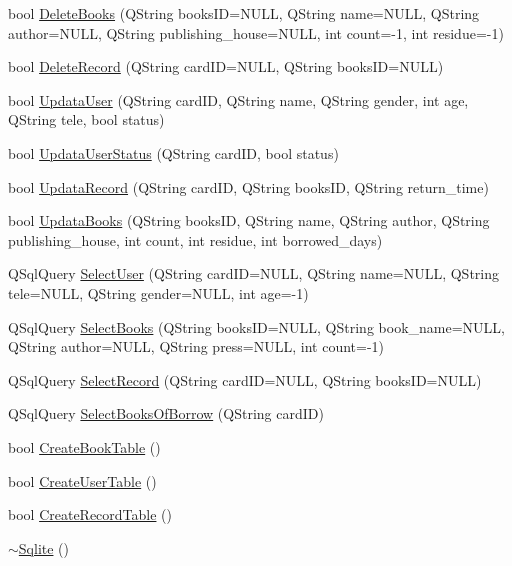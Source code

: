 \begin{DoxyCompactItemize}
\item 
bool \mbox{\hyperlink{class_sqlite_a8a83c22e036086edf84758fb0f6cfc56}{Delete\+Books}} (Q\+String books\+ID=N\+U\+LL, Q\+String name=N\+U\+LL, Q\+String author=N\+U\+LL, Q\+String publishing\+\_\+house=N\+U\+LL, int count=-\/1, int residue=-\/1)
\item 
bool \mbox{\hyperlink{class_sqlite_aa120de86db20f42a61a5c2eae9ad6b89}{Delete\+Record}} (Q\+String card\+ID=N\+U\+LL, Q\+String books\+ID=N\+U\+LL)
\item 
bool \mbox{\hyperlink{class_sqlite_a7909130f3bbef819bd808c49c9249e2c}{Updata\+User}} (Q\+String card\+ID, Q\+String name, Q\+String gender, int age, Q\+String tele, bool status)
\item 
bool \mbox{\hyperlink{class_sqlite_a9827a7be15c19a7ecc943b701baa932b}{Updata\+User\+Status}} (Q\+String card\+ID, bool status)
\item 
bool \mbox{\hyperlink{class_sqlite_a5cb753f7b603cc450ef9527bf96d51f1}{Updata\+Record}} (Q\+String card\+ID, Q\+String books\+ID, Q\+String return\+\_\+time)
\item 
bool \mbox{\hyperlink{class_sqlite_a6fc03a68c321e300dc540d0a48eabc70}{Updata\+Books}} (Q\+String books\+ID, Q\+String name, Q\+String author, Q\+String publishing\+\_\+house, int count, int residue, int borrowed\+\_\+days)
\item 
Q\+Sql\+Query \mbox{\hyperlink{class_sqlite_aa540de99093cdea8160088a2c69872ee}{Select\+User}} (Q\+String card\+ID=N\+U\+LL, Q\+String name=N\+U\+LL, Q\+String tele=N\+U\+LL, Q\+String gender=N\+U\+LL, int age=-\/1)
\item 
Q\+Sql\+Query \mbox{\hyperlink{class_sqlite_a045a181307b20222cd5a6c6f5f428281}{Select\+Books}} (Q\+String books\+ID=N\+U\+LL, Q\+String book\+\_\+name=N\+U\+LL, Q\+String author=N\+U\+LL, Q\+String press=N\+U\+LL, int count=-\/1)
\item 
Q\+Sql\+Query \mbox{\hyperlink{class_sqlite_a3c012aa302538385ce05d0b0371a9860}{Select\+Record}} (Q\+String card\+ID=N\+U\+LL, Q\+String books\+ID=N\+U\+LL)
\item 
Q\+Sql\+Query \mbox{\hyperlink{class_sqlite_ab9e451e38960661c5a493948453b63c7}{Select\+Books\+Of\+Borrow}} (Q\+String card\+ID)
\item 
bool \mbox{\hyperlink{class_sqlite_a2c8180569a048b3e69abd84a044caec6}{Create\+Book\+Table}} ()
\item 
bool \mbox{\hyperlink{class_sqlite_aa0840501ef42abf7fff8efc064caae01}{Create\+User\+Table}} ()
\item 
bool \mbox{\hyperlink{class_sqlite_ae84aab901a62d1876dcfca3f190af12c}{Create\+Record\+Table}} ()
\item 
\mbox{\hyperlink{class_sqlite_adc35a543dca91edc3ffb90a3825dd54a}{$\sim$\+Sqlite}} ()
\end{DoxyCompactItemize}


